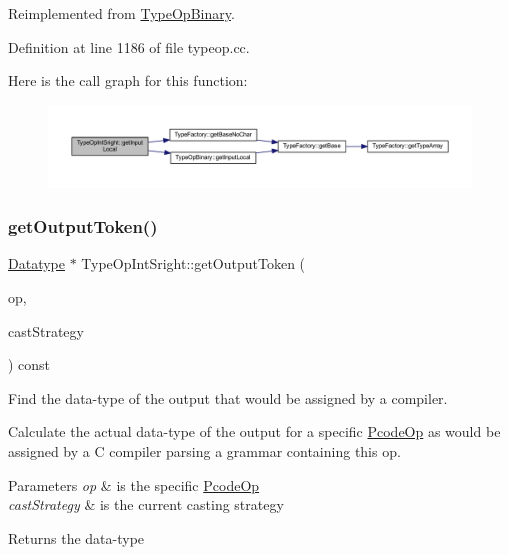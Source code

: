Reimplemented from \mbox{\hyperlink{class_type_op_binary_a6b8460b8ee0e97579321c6d02fe4fd29}{Type\+Op\+Binary}}.



Definition at line 1186 of file typeop.\+cc.

Here is the call graph for this function\+:
\nopagebreak
\begin{figure}[H]
\begin{center}
\leavevmode
\includegraphics[width=350pt]{class_type_op_int_sright_a684bdbbed1aa1ac2fc0d08caf5e0ca24_cgraph}
\end{center}
\end{figure}
\mbox{\label{class_type_op_int_sright_a2e2989e20e9ccdcd2e56d719202ac0fc}} 
\subsubsection{\texorpdfstring{getOutputToken()}{getOutputToken()}}
{\footnotesize\ttfamily \mbox{\hyperlink{class_datatype}{Datatype}} $\ast$ Type\+Op\+Int\+Sright\+::get\+Output\+Token (\begin{DoxyParamCaption}\item[{const \mbox{\hyperlink{class_pcode_op}{Pcode\+Op}} $\ast$}]{op,  }\item[{\mbox{\hyperlink{class_cast_strategy}{Cast\+Strategy}} $\ast$}]{cast\+Strategy }\end{DoxyParamCaption}) const\hspace{0.3cm}{\ttfamily [virtual]}}



Find the data-\/type of the output that would be assigned by a compiler. 

Calculate the actual data-\/type of the output for a specific \mbox{\hyperlink{class_pcode_op}{Pcode\+Op}} as would be assigned by a C compiler parsing a grammar containing this op. 
\begin{DoxyParams}{Parameters}
{\em op} & is the specific \mbox{\hyperlink{class_pcode_op}{Pcode\+Op}} \\
\hline
{\em cast\+Strategy} & is the current casting strategy \\
\hline
\end{DoxyParams}
\begin{DoxyReturn}{Returns}
the data-\/type 
\end{DoxyReturn}


